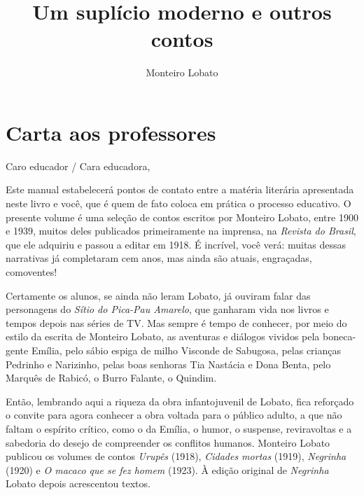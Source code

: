 \documentclass[12pt]{extarticle}
\begin{document}
\newcommand{\AutorLivro}{Monteiro Lobato}
\newcommand{\TituloLivro}{Um suplício moderno e outros contos}
\newcommand{\Tema}{Ficção, mistério e fantasia}
\newcommand{\Genero}{Conto, crônica e novela}
\newcommand{\issnppub}{---}
\newcommand{\issnepub}{---}
\newcommand{\colaborador}{\textbf{Ieda Lebensztayn} é uma pessoa incrível e vai fazer um bom serviço.}


\title{\TituloLivro}
\author{\AutorLivro}
\def\authornotes{\colaborador}

\date{}
\maketitle
\tableofcontents

\pagebreak

\section{Carta aos professores}

Caro educador / Cara educadora,\\\bigskip

\reversemarginpar
\marginparwidth=5cm

Este manual estabelecerá pontos de contato entre a matéria literária
apresentada neste livro e você, que é quem de fato coloca em prática o
processo educativo. O presente volume é uma seleção de contos escritos
por Monteiro Lobato, entre 1900 e 1939, muitos deles publicados
primeiramente na imprensa, na \emph{Revista do Brasil}, que ele adquiriu
e passou a editar em 1918. É incrível, você verá: muitas dessas
narrativas já completaram cem anos, mas ainda são atuais, engraçadas,
comoventes!

Certamente os alunos, se ainda não leram Lobato, já ouviram falar das
personagens do \emph{Sítio do Pica-Pau Amarelo}, que ganharam vida nos
livros e tempos depois nas séries de TV. Mas sempre é tempo de conhecer,
por meio do estilo da escrita de Monteiro Lobato, as aventuras e
diálogos vividos pela boneca-gente Emília, pelo sábio espiga de milho
Visconde de Sabugosa, pelas crianças Pedrinho e Narizinho, pelas boas
senhoras Tia Nastácia e Dona Benta, pelo Marquês de Rabicó, o Burro
Falante, o Quindim.

Então, lembrando aqui a riqueza da obra infantojuvenil de Lobato, fica
reforçado o convite para agora conhecer a obra voltada para o público
adulto, a que não faltam o espírito crítico, como o da Emília, o humor,
o suspense, reviravoltas e a sabedoria do desejo de compreender os
conflitos humanos. Monteiro Lobato publicou os volumes de contos
\emph{Urupês} (1918), \emph{Cidades mortas} (1919), \emph{Negrinha}
(1920) e \emph{O macaco que se fez homem} (1923). À edição original de
\emph{Negrinha} Lobato depois acrescentou textos.
\end{document}
